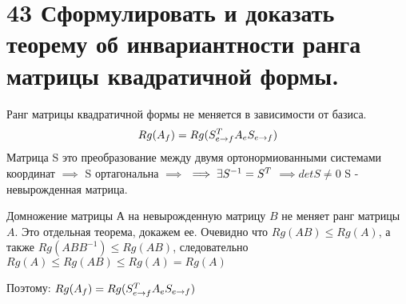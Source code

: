 \documentclass[a4paper,12pt,twoside]{article}
\begin{document}
\section{43 Сформулировать и доказать теорему об инвариантности ранга матрицы квадратичной формы. }
Ранг матрицы квадратичной формы не меняется в зависимости от базиса.
\[
Rg( A_{f} ) = Rg( S_{e \rightarrow f}^{{\small T}} A_{e} S_{e \rightarrow f} )
\]
Матрица S это преобразование между двумя 
ортонормиованными системами координат
$ \implies $ S ортагональна  $ \implies $
$ \implies \exists S^{-1} = S^{{\small T}} $
$ \implies det S  \neq 0 $
S - невырожденная матрица.

Домножение матрицы $А$ на невырожденную матрицу $B$ не меняет ранг матрицы $A$. Это отдельная теорема, докажем ее. 
Очевидно что $ Rg( A B ) \leq Rg(A) $, а также $ Rg( A B B^{-1} ) \leq Rg( A B ) $, следовательно
$ Rg(A) \leq Rg(A B) \leq Rg( A ) = Rg(A) $

Поэтому:
$ Rg( A_{f} ) = Rg( S_{e \rightarrow f}^{{\small T}} A_{e} S_{e \rightarrow f} ) $
\end{document}
